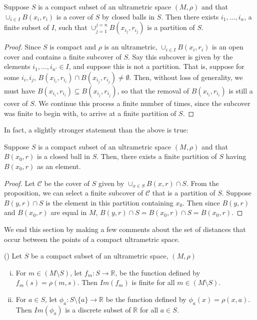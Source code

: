 \begin{proposition}
Suppose $S$ is a compact subset of an ultrametric space $(M, \rho)$ and that $\cup_{i \in I} B(x_i,r_i)$ is a cover of $S$ by closed balls in $S$. Then there exists $i_1,\ldots, i_n$, a finite subset of $I$, such that  $\cup_{j=1}^{j=n} B(x_{i_j},r_{i_j})$ is a partition of $S$.
\end{proposition}

\begin{proof}
Since $S$ is compact and $\rho$ is an ultrametric, $\cup_{i \in I} B(x_i,r_i)$ is an open cover and contains a finite subcover of $S$. Say this subcover is given by the elements  $i_1,\ldots, i_{n'} \in I$, and suppose this is not a partition. That is, suppose for some $i_i, i_j$, $ B(x_{i_i},r_{i_i}) \cap  B(x_{i_j},r_{i_j}) \neq \emptyset$. Then, without loss of generality, we must have $ B(x_{i_i},r_{i_i}) \subseteq  B(x_{i_j},r_{i_j})$, so that the removal of $ B(x_{i_i},r_{i_i})$ is still a cover of $S$. We continue this process a finite number of times, since the subcover was finite to begin with, to arrive at a finite partition of $S$.
\end{proof}

In fact, a slightly stronger statement than the above is true:\\

\begin{corollary}
Suppose $S$ is a compact subset of an ultrametric space $(M, \rho)$ and that $B(x_0,r)$ is a closed ball in $S$. Then, there exists a finite partition of $S$ having $B(x_0,r)$ as an element.
\end{corollary}

\begin{proof}
Let $\mathcal{C}$ be the cover of $S$ given by $\cup_{x\in S} B(x,r) \cap S$. From the proposition, we can select a finite subcover of $\mathcal{C}$ that is a partition of $S$. Suppose $B(y,r) \cap S$ is the element in this partition containing $x_0$. Then  since $B(y,r)$ and $B(x_0,r)$ are equal in $M$, $B(y,r) \cap S = B(x_0,r) \cap S = B(x_0,r)$.
\end{proof}

We end this section by making a few comments about the set of distances that occur between the points of a compact ultrametric space.\\

\begin{proposition}
(\cite{ar}) Let $S$ be a compact subset of an ultrametric space, $(M, \rho)$
\begin{enumerate}[(i)]
\item For $m \in (M \setminus S)$, let $f_m:S \rightarrow \mathbb{R}$, be the function defined by $f_m(s) = \rho(m,s)$. Then $Im(f_m)$ is finite for all $m \in (M \setminus S)$.
\item For $a \in S$, let $\phi_a: S \setminus \{a\} \rightarrow \mathbb{R}$ be the function defined by $\phi_a(x)=\rho(x,a)$. Then $Im(\phi_a)$ is a discrete subset of $\mathbb{R}$ for all $a \in S$.
\end{enumerate}
\end{proposition}

